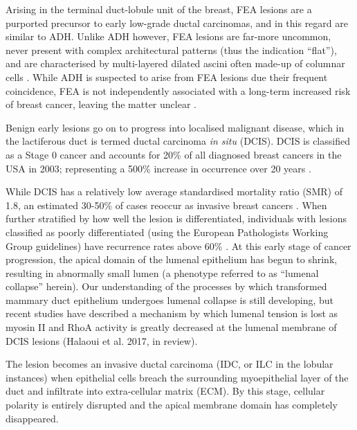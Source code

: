 Arising in the terminal duct-lobule unit of the breast, FEA lesions are a purported precursor to early low-grade ductal carcinomas, and in this regard are similar to ADH. Unlike ADH however, FEA lesions are far-more uncommon, never present with complex architectural patterns (thus the indication ``flat''), and are characterised by multi-layered dilated ascini often made-up of columnar cells \citep{pinder2017}. While ADH is suspected to arise from FEA lesions due their frequent coincidence, FEA is not independently associated with a long-term increased risk of breast cancer, leaving the matter unclear \citep{bombonati2011,lerwill2008,acott2016}.

%
%


Benign early lesions go on to progress into localised malignant disease, which in the lactiferous duct is termed ductal carcinoma {\it in situ} (DCIS). DCIS is classified as a Stage 0 cancer and accounts for 20\% of all diagnosed breast cancers in the USA in 2003; representing a 500\% increase in occurrence over 20 years \citep{bleicher2013, kerlikowske2010}.\par

While DCIS has a relatively low average standardised mortality ratio (SMR) of 1.8, an estimated 30-50\% of cases reoccur as invasive breast cancers \citep{narod2015,page1982,betsill1978}. When further stratified by how well the lesion is differentiated, individuals with lesions classified as poorly differentiated (using the European Pathologists Working Group guidelines) have recurrence rates above 60\% \citep{badve1998}. At this early stage of cancer progression, the apical domain of the lumenal epithelium has begun to shrink, resulting in abnormally small lumen (a phenotype referred to as ``lumenal collapse'' herein). Our understanding of the processes by which transformed mammary duct epithelium undergoes lumenal collapse is still developing, but recent studies have described a mechanism by which lumenal tension is lost as myosin II and RhoA activity is greatly decreased at the lumenal membrane of DCIS lesions (Halaoui et al. 2017, in review). \par

The lesion becomes an invasive ductal carcinoma (IDC, or ILC in the lobular instances) when epithelial cells breach the surrounding myoepithelial layer of the duct and infiltrate into extra-cellular matrix (ECM). By this stage, cellular polarity is entirely disrupted and the apical membrane domain has completely disappeared.\par
